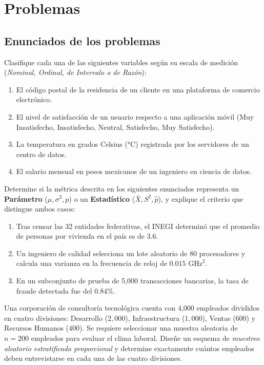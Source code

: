 \section*{Problemas}

\subsection*{Enunciados de los problemas}

\begin{problema}
	\label{prob:de3bea1}
	Clasifique cada una de las siguientes variables según su escala de medición (\emph{Nominal, Ordinal, de Intervalo o de Razón}):
	\begin{enumerate}
		\item El código postal de la residencia de un cliente en una plataforma de comercio electrónico.
		\item El nivel de satisfacción de un usuario respecto a una aplicación móvil (Muy Insatisfecho, Insatisfecho, Neutral, Satisfecho, Muy Satisfecho).
		\item La temperatura en grados Celsius (°C) registrada por los servidores de un centro de datos.
		\item El salario mensual en pesos mexicanos de un ingeniero en ciencia de datos.
	\end{enumerate}
\end{problema}

\begin{problema}
	\label{prob:7b7dc88}
	Determine si la métrica descrita en los siguientes enunciados representa un \textbf{Parámetro} ($\mu, \sigma^2, p$) o un \textbf{Estadístico} ($\bar{X}, S^2, \hat{p}$), y explique el criterio que distingue ambos casos:
	\begin{enumerate}
		\item Tras censar las 32 entidades federativas, el INEGI determinó que el promedio de personas por vivienda en el país es de $3.6$.
		\item Un ingeniero de calidad selecciona un lote aleatorio de 80 procesadores y calcula una varianza en la frecuencia de reloj de $0.015 \text{ GHz}^2$.
		\item En un subconjunto de prueba de 5,000 transacciones bancarias, la tasa de fraude detectada fue del $0.84\%$.
	\end{enumerate}
\end{problema}

\begin{problema}
	\label{prob:4bc23ad}
	Una corporación de consultoría tecnológica cuenta con 4,000 empleados divididos en cuatro divisiones: Desarrollo ($2,000$), Infraestructura ($1,000$), Ventas ($600$) y Recursos Humanos ($400$). Se requiere seleccionar una muestra aleatoria de $n = 200$ empleados para evaluar el clima laboral. Diseñe un esquema de \emph{muestreo aleatorio estratificado proporcional} y determine exactamente cuántos empleados deben entrevistarse en cada una de las cuatro divisiones.
\end{problema}

